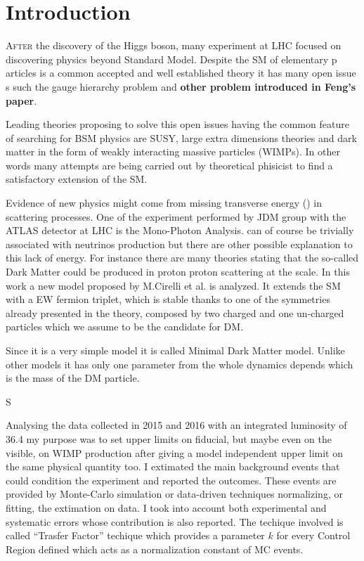 \chapter{Introduction}
\lettrine{A}{fter} the discovery of the Higgs boson, many experiment at LHC focused on discovering physics beyond Standard Model. Despite the SM of elementary p articles is a common accepted and well established theory it has many open issue s such the gauge hierarchy problem and {\bfseries other problem introduced in Feng's paper}.
  
  Leading theories proposing to solve this open issues having the common feature of searching for BSM physics are SUSY, large extra dimensions theories and dark matter in the form of weakly interacting massive particles (WIMPs). In other words many attempts are being carried out by theoretical phisicist to find a satisfactory extension of the SM.

  Evidence of new physics might come from missing transverse energy (\MET) in scattering processes. One of the experiment performed by JDM group with the ATLAS detector at LHC is the Mono-Photon Analysis. \MET can of course be trivially associated with neutrinos production but there are other possible explanation to this lack of energy. For instance there are many theories stating that the so-called Dark Matter could be produced in proton proton scattering at the \TeV scale. In this work a new model proposed by M.Cirelli et al. is analyzed. It extends the SM with a EW fermion triplet, which is stable thanks to one of the symmetries already presented in the theory, composed by two charged and one un-charged particles which we assume to be the candidate for DM.

  Since it is a very simple model it is called Minimal Dark Matter model. Unlike other models it has only one parameter from the whole dynamics depends which is the mass of the DM particle.
  
  S  

  Analysing the data collected in 2015 and 2016 with an integrated luminosity of 36.4 \ifb my purpose was to set upper limits on fiducial, but maybe even on the visible, on WIMP production after giving a model independent upper limit on the same physical quantity too. I extimated the main background events that could condition the experiment and reported the outcomes. These events are provided by Monte-Carlo simulation or data-driven techniques normalizing, or fitting, the extimation on data. I took into account both experimental and systematic errors whose contribution is also reported. The techique involved is called ``Trasfer Factor'' techique which provides a parameter $k$ for every Control Region defined which acts as a normalization constant of MC events. 

